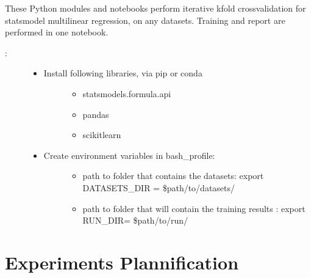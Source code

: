 \documentclass[letterpaper,10pt,english]{sphinxmanual}
\begin{document}
\sphinxAtStartPar
These Python modules and notebooks perform iterative k\sphinxhyphen{}fold crossvalidation for statsmodel multilinear regression, on any datasets. Training and report are performed in one notebook.
\begin{description}
\item[{:}] \leavevmode\begin{itemize}
\item {} \begin{description}
\item[{Install following libraries, via pip or conda}] \leavevmode\begin{itemize}
\item {} 
\sphinxAtStartPar
statsmodels.formula.api

\item {} 
\sphinxAtStartPar
pandas

\item {} 
\sphinxAtStartPar
scikit\sphinxhyphen{}learn

\end{itemize}

\end{description}

\item {} \begin{description}
\item[{Create environment variables in bash\_profile:}] \leavevmode\begin{itemize}
\item {} 
\sphinxAtStartPar
path to folder that contains the datasets: export DATASETS\_DIR = \$path/to/datasets/

\item {} 
\sphinxAtStartPar
path to folder that will contain the training results : export RUN\_DIR= \$path/to/run/

\end{itemize}

\end{description}

\end{itemize}

\end{description}


\chapter{Experiments Plannification}
\label{\detokenize{ExperimentsPlannification:experiments-plannification}}\label{\detokenize{ExperimentsPlannification::doc}}
\end{document}
